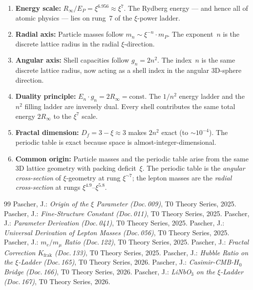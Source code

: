 \begin{enumerate}
  \item \textbf{Energy scale:} $R_\infty / E_P = \xi^{6.956} \approx \xi^7$.
    The Rydberg energy — and hence all of atomic physics — lies on rung~7
    of the $\xi$-power ladder.

  \item \textbf{Radial axis:} Particle masses follow $m_n \sim \xi^{-n} \cdot m_P$.
    The exponent~$n$ is the discrete lattice radius in the radial $\xi$-direction.

  \item \textbf{Angular axis:} Shell capacities follow $g_n = 2n^2$.
    The index~$n$ is the same discrete lattice radius, now acting as a shell
    index in the angular 3D-sphere direction.

  \item \textbf{Duality principle:} $E_n \cdot g_n = 2R_\infty = \text{const}$.
    The $1/n^2$ energy ladder and the $n^2$ filling ladder are inversely dual.
    Every shell contributes the same total energy $2R_\infty$ to the $\xi^7$ scale.

  \item \textbf{Fractal dimension:} $D_f = 3 - \xi \approx 3$ makes $2n^2$ exact
    (to $\sim 10^{-4}$). The periodic table is exact because space is
    almost-integer-dimensional.

  \item \textbf{Common origin:} Particle masses and the periodic table arise from
    the same 3D lattice geometry with packing deficit~$\xi$.
    The periodic table is the \emph{angular cross-section} of $\xi$-geometry
    at rung $\xi^{\sim 7}$; the lepton masses are the \emph{radial cross-section}
    at rungs $\xi^{4.9}$–$\xi^{5.8}$.
\end{enumerate}

\begin{thebibliography}{99}
 Pascher, J.: \emph{Origin of the $\xi$ Parameter (Doc.\,009)},
  T0 Theory Series, 2025.
 Pascher, J.: \emph{Fine-Structure Constant (Doc.\,011)},
  T0 Theory Series, 2025.
 Pascher, J.: \emph{Parameter Derivation (Doc.\,041)},
  T0 Theory Series, 2025.
 Pascher, J.: \emph{Universal Derivation of Lepton Masses (Doc.\,056)},
  T0 Theory Series, 2025.
 Pascher, J.: \emph{$m_e/m_\mu$ Ratio (Doc.\,122)},
  T0 Theory Series, 2025.
 Pascher, J.: \emph{Fractal Correction $K_\text{frak}$ (Doc.\,133)},
  T0 Theory Series, 2025.
 Pascher, J.: \emph{Hubble Ratio on the $\xi$-Ladder (Doc.\,165)},
  T0 Theory Series, 2026.
 Pascher, J.: \emph{Casimir-CMB-$H_0$ Bridge (Doc.\,166)},
  T0 Theory Series, 2026.
 Pascher, J.: \emph{LiNbO$_3$ on the $\xi$-Ladder (Doc.\,167)},
  T0 Theory Series, 2026.
\end{thebibliography}
